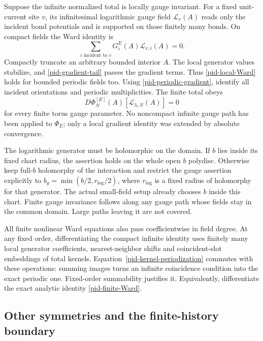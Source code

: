 \documentclass[11pt]{article}
\theoremstyle{remark}
\begin{document}
Suppose the infinite normalized total is locally gauge invariant.
For a fixed unit-current site $v$, its infinitesimal logarithmic
gauge field $\mathcal L_v(A)$ reads only the incident bond
potentials and is supported on those finitely many bonds.
On compact fields the Ward identity is
\begin{equation}
 \sum_{i\text{ incident to }v}
                    G_i^E(A)\mathcal L_{v,i}(A)=0.
 \label{pid-local-Ward}
\end{equation}
Compactly truncate an arbitrary bounded interior $A$. The local
generator values stabilize, and \eqref{pid-gradient-tail}
passes the gradient terms. Thus \eqref{pid-local-Ward} holds
for bounded periodic fields too. Using
\eqref{pid-periodic-gradient}, identify all incident orientations
and periodic multiplicities. The finite total obeys
\begin{equation}
 D\Phi_N^{[E]}(A)[\mathcal L_{\lambda,N}(A)]=0
 \label{pid-finite-Ward}
\end{equation}
for every finite torus gauge parameter. No noncompact infinite
gauge path has been applied to $\Phi_E$; only a local gradient
identity was extended by absolute convergence.

The logarithmic generator must be holomorphic on the domain.
If $b$ lies inside its fixed chart radius, the assertion holds
on the whole open $b$ polydisc. Otherwise keep full-$b$
holomorphy of the interaction and restrict the gauge assertion
explicitly to $b_g=\min(b/2,r_{\log}/2)$, where $r_{\log}$ is
a fixed radius of holomorphy for that generator. The actual
small-field setup already chooses $b$ inside this chart. Finite
gauge invariance follows along any gauge path whose fields stay
in the common domain. Large paths leaving it are not covered.

All finite nonlinear Ward equations also pass coefficientwise
in field degree. At any fixed order, differentiating the compact
infinite identity uses finitely many local generator coefficients,
nearest-neighbor shifts and coincident-slot embeddings of total
kernels. Equation~\eqref{pid-kernel-periodization} commutes with
these operations: summing images turns an infinite coincidence
condition into the exact periodic one. Fixed-order summability
justifies it. Equivalently, differentiate the exact analytic
identity \eqref{pid-finite-Ward}.

\subsection{Other symmetries and the finite-history boundary}
\label{pid-scope-section}
\end{document}
